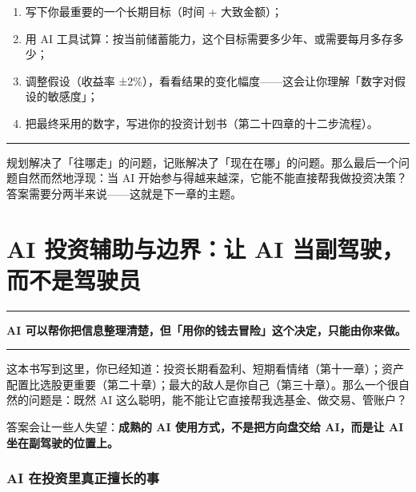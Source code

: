 \documentclass[a4paper,11pt,oneside,fontset=none,UTF8,zihao=-4]{ctexbook}
\providecommand{\tightlist}{\setlength{\itemsep}{2pt}\setlength{\parskip}{1pt}}
\begin{document}
\begin{enumerate}
\def\labelenumi{\arabic{enumi}.}
\tightlist
\item
  写下你最重要的一个长期目标（时间 + 大致金额）；
\item
  用 AI
  工具试算：按当前储蓄能力，这个目标需要多少年、或需要每月多存多少；
\item
  调整假设（收益率
  ±2\%），看看结果的变化幅度------这会让你理解「数字对假设的敏感度」；
\item
  把最终采用的数字，写进你的投资计划书（第二十四章的十二步流程）。
\end{enumerate}

\begin{center}{\color{dh-bronze}\rule{0.2\textwidth}{0.5pt}}\end{center}

规划解决了「往哪走」的问题，记账解决了「现在在哪」的问题。那么最后一个问题自然而然地浮现：当
AI
开始参与得越来越深，它能不能直接帮我做投资决策？答案需要分两半来说------这就是下一章的主题。

\newpage

\chapter{AI 投资辅助与边界：让 AI
当副驾驶，而不是驾驶员}\label{ai-ux6295ux8d44ux8f85ux52a9ux4e0eux8fb9ux754cux8ba9-ai-ux5f53ux526fux9a7eux9a76ux800cux4e0dux662fux9a7eux9a76ux5458}

\begin{center}{\color{dh-bronze}\rule{0.2\textwidth}{0.5pt}}\end{center}

\begin{dhquote}
\textbf{AI
可以帮你把信息整理清楚，但「用你的钱去冒险」这个决定，只能由你来做。}
\end{dhquote}

\begin{center}{\color{dh-bronze}\rule{0.2\textwidth}{0.5pt}}\end{center}

这本书写到这里，你已经知道：投资长期看盈利、短期看情绪（第十一章）；资产配置比选股更重要（第二十章）；最大的敌人是你自己（第三十章）。那么一个很自然的问题是：既然
AI 这么聪明，能不能让它直接帮我选基金、做交易、管账户？

答案会让一些人失望：\textbf{成熟的 AI 使用方式，不是把方向盘交给
AI，而是让 AI 坐在副驾驶的位置上。}

\subsection{AI
在投资里真正擅长的事}\label{ai-ux5728ux6295ux8d44ux91ccux771fux6b63ux64c5ux957fux7684ux4e8b}
\end{document}
